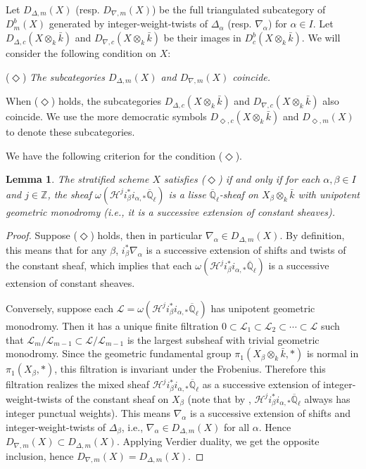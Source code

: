 \documentclass{amsart}
\theoremstyle{plain}
\newtheorem{lemma}[subsubsection]{Lemma}
\theoremstyle{definition}
\theoremstyle{remark}
\numberwithin{equation}{subsection}
\begin{document}
Let $D_{\Delta,m}(X)$ (resp. $D_{\nabla,m}(X)$) be the full triangulated subcategory of ${D^b_m({X})}$ generated by integer-weight-twists of $\Delta_\alpha$ (resp. $\nabla_\alpha$) for $\alpha\in I$. Let $D_{\Delta,c}({{X}\otimes_k\bar{k}})$  and $D_{\nabla,c}({{X}\otimes_k\bar{k}})$ be their images in ${D^b_c({{{X}}\otimes_k\bar{k}})}$. We will consider the following condition on $X$:

($\Diamond$) {\em The subcategories $D_{\Delta,m}(X)$ and $D_{\nabla,m}(X)$ coincide.}

When ($\Diamond$) holds, the subcategories $D_{\Delta,c}({{X}\otimes_k\bar{k}})$ and $D_{\nabla,c}({{X}\otimes_k\bar{k}})$ also coincide. We use the more democratic symbols ${D_{\Diamond,c}({{{X}}\otimes_k\bar{k}})}$ and ${D_{\Diamond,m}({X})}$ to denote these subcategories.

We have the following criterion for the condition ($\Diamond$).

\begin{lemma}
The stratified scheme $X$ satisfies ($\Diamond$) if and only if for each $\alpha,\beta\in I$ and $j\in{\mathbb{Z}}$, the sheaf $\omega({\mathcal{H}}^ji_{\beta}^*i_{\alpha,*}{\overline{\mathbb{Q}}_{\ell}})$ is a lisse ${\overline{\mathbb{Q}}_{\ell}}$-sheaf on ${{X_\beta}\otimes_k\bar{k}}$ with unipotent geometric monodromy (i.e., it is a successive extension of constant sheaves).
\end{lemma}
\begin{proof}
Suppose ($\Diamond$) holds, then in particular $\nabla_\alpha\in D_{\Delta,m}(X)$. By definition, this means that for any $\beta$, $i^*_\beta\nabla_\alpha$ is a successive extension of shifts and twists of the constant sheaf, which implies that each $\omega({\mathcal{H}}^ji_{\beta}^*i_{\alpha,*}{\overline{\mathbb{Q}}_{\ell}})$ is a successive extension of constant sheaves.

Conversely, suppose each ${\mathcal{L}}=\omega({\mathcal{H}}^ji_{\beta}^*i_{\alpha,*}{\overline{\mathbb{Q}}_{\ell}})$ has unipotent geometric monodromy. Then it has a unique finite filtration $0\subset{\mathcal{L}}_1\subset{\mathcal{L}}_2\subset\cdots\subset{\mathcal{L}}$ such that ${\mathcal{L}}_m/{\mathcal{L}}_{m-1}\subset{\mathcal{L}}/{\mathcal{L}}_{m-1}$ is the largest subsheaf with trivial geometric monodromy. Since the geometric fundamental group $\pi_1({{X_\beta}\otimes_k\bar{k}},*)$ is normal in $\pi_1(X_\beta,*)$, this filtration is invariant under the Frobenius. Therefore this filtration realizes the mixed sheaf ${\mathcal{H}}^ji_{\beta}^*i_{\alpha,*}{\overline{\mathbb{Q}}_{\ell}}$ as a successive extension of integer-weight-twists of the constant sheaf on $X_\beta$ (note that by \cite{Del}, ${\mathcal{H}}^ji_{\beta}^*i_{\alpha,*}{\overline{\mathbb{Q}}_{\ell}}$ always has integer punctual weights). This means $\nabla_\alpha$ is a successive extension of shifts and integer-weight-twists of $\Delta_\beta$, i.e., $\nabla_\alpha\in D_{\Delta,m}(X)$ for all $\alpha$. Hence $D_{\nabla,m}(X)\subset D_{\Delta,m}(X)$. Applying Verdier duality, we get the opposite inclusion, hence $D_{\nabla,m}(X)=D_{\Delta,m}(X)$.
\end{proof}
\end{document}
